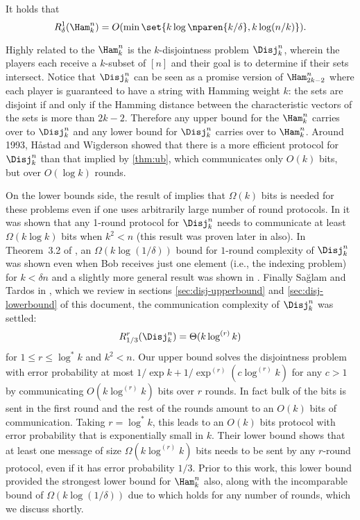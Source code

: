 \begin{theorem}
\label{thm:ub}
It holds that $$R^1_\delta(\Ham^n_k) = 
O(\min\set{k\log\nparen{k/\delta}, k\log (n/k)}).$$
\end{theorem}

Highly related to the $\Ham^n_k$ is the $k$-disjointness 
problem $\Disj^n_k$, wherein the players each receive a 
$k$-subset of $[n]$ and their goal is to determine if their 
sets intersect.
Notice that $\Disj^n_k$ can be seen as a promise version of
$\Ham^n_{2k-2}$ where each player is guaranteed to have a string
with Hamming weight $k$: the sets are disjoint if and only if the
Hamming distance between the characteristic vectors of the sets
is more than $2k-2$. Therefore any upper bound for the $\Ham^n_k$ 
carries over to $\Disj^n_k$ and any lower bound for $\Disj^n_k$
carries over to $\Ham^n_k$.
Around 1993, 
Håstad and Wigderson \cite{HastadW2007} showed that
there is a more efficient protocol for $\Disj^n_k$ than that implied 
by \autoref{thm:ub}, which communicates only $O(k)$ bits, but over
$O(\log k)$ rounds.

On the lower bounds side, the result of \cite{KalyanasundaramS1992}
implies that $\Omega(k)$ bits is needed for these problems even
if one uses arbitrarily large number of round protocols.
In \cite{BuhrmanGMW2012} it was shown that
any 1-round protocol for $\Disj^n_k$ needs to communicate
at least $\Omega(k \log k)$ bits when $k^2<n$
(this result was proven later in \cite{DasguptaKS12} also).
In Theorem~3.2 of \cite{Saglam2011}, an $\Omega(k\log(1/\delta))$
bound for $1$-round complexity of $\Disj^n_k$ was shown even 
when Bob receives just one element (i.e., the indexing problem) 
for $k<\delta n$ and a 
slightly more general result was shown in \cite{JayramW2011}.
Finally Sağlam and Tardos in \cite{SaglamT2013}, 
which we review in sections \ref{sec:disj-upperbound} and 
\ref{sec:disj-lowerbound} of this document, the communication complexity
of $\Disj^n_k$ was settled:
\begin{align*}
R^r_{1/3}(\Disj^n_k)=\Theta(k\log^{(r)}k)
\end{align*}
for $1\le r \le \log^*k$ and $k^2<n$.
Our upper bound solves the disjointness problem with 
error probability at most $1/\exp k + 1/\exp^{(r)}(c\log^{(r)}k)$ 
for any $c>1$ by communicating
$O(k \log^{(r)} k)$ bits over $r$ rounds. In fact bulk of the bits
is sent in the first round and the rest of the rounds
amount to an $O(k)$ bits of communication. Taking $r=\log^* k$,
this leads to an $O(k)$ bits protocol with error probability 
that is exponentially small in $k$.
Their lower bound shows that at least one
message of size 
$\Omega(k\log^{(r)} k)$ bits needs to be sent by any 
$r$-round protocol, even if it has error probability $1/3$.
Prior to this work, this lower bound provided the strongest lower
bound for $\Ham^n_k$ also, along with the incomparable bound of 
$\Omega(k\log (1/\delta))$ due to \cite{BlaisBG2014}
which holds for any number of rounds, which we discuss shortly.

